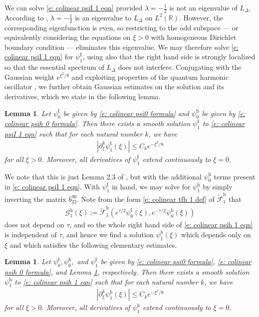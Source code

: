 \documentclass[11pt]{article}
\newcommand{\R}{\mathbb{R}}
\newtheorem{lemma}[prop]{Lemma}
\numberwithin{equation}{section}
\numberwithin{prop}{section}
\newcommand{\psih}{\psi^\mathrm{h}}
\newcommand{\Gh}{\mathcal{G}^\mathrm{h}}
\newcommand{\tfh}{\tilde{\mathcal{F}}^\mathrm{h}}
\newcommand{\psiI}{\psi^\mathrm{I}}
\begin{document}
We can solve \eqref{e: colinear psiI 1 eqn} provided $\lambda = -\frac{1}{2}$ is not an eigenvalue of $L_\Delta$. According to \cite[Appendix A]{GallayWayne}, $\lambda = -\frac{1}{2}$ is an eigenvalue to $L_\Delta$ on $L^2 (\R)$. However, the corresponding eigenfunction is even, so restricting to the odd subspace ---  or equivalently considering the equations on $\xi > 0$ with homogeneous Dirichlet boundary condition --- eliminates this eigenvalue. We may therefore solve \eqref{e: colinear psiI 1 eqn} for $\psiI_1$, using also that the right hand side is strongly localized so that the essential spectrum of $L_\Delta$ does not interfere. Conjugating with the Gaussian weight $e^{\xi^2/8}$ and exploiting properties of the quantum harmonic oscillator \cite{Helffer}, we further obtain Gaussian estimates on the solution and its derivatives, which we state in the following lemma. 
\begin{lemma}\label{l: colinear psiI 1}
	Let $\psiI_0$ be given by \eqref{e: colinear psi0 formula} and $\psih_0$ be given by \eqref{e: colinear psih 0 formula}. Then there exists a smooth solution $\psiI_1$ to \eqref{e: colinear psiI 1 eqn} such that for each natural number $k$, we have 
	\begin{align}
	|\partial_\xi^k \psiI_1 (\xi) | \leq C_k e^{-\xi^2/8} 
	\end{align}
	for all $\xi > 0$. Moreover, all derivatives of $\psiI_1$ extend continuously to $\xi = 0$. 
\end{lemma}
We note that this is just Lemma 2.3 of \cite{CAMS}, but with the additional $\psih_0$ terms present in \eqref{e: colinear psiI 1 eqn}. With $\psiI_1$ in hand, we may solve for $\psih_1$ by simply inverting the matrix $b_{22}^{00}$. Note from the form \eqref{e: colinear tfh 1 def} of $\tfh_1$ that
\begin{align}
\Gh_1(\xi) := \tfh_1 (e^{\tau/2} \psiI_0(\xi), e^{-\tau/2} \psih_0 (\xi)) 
\end{align}
does not depend on $\tau$, and so the whole right hand side of \eqref{e: colinear psih 1 eqn} is independent of $\tau$, and hence we find a solution $\psih_1(\xi)$ which depends only on $\xi$ and which satisfies the following elementary estimates.
\begin{lemma}\label{l: colinear psih 1}
	Let $\psiI_0, \psih_0,$ and $\psiI_1$ be given by \eqref{e: colinear psi0 formula}, \eqref{e: colinear psih 0 formula}, and Lemma \ref{l: colinear psiI 1}, respectively. Then there exists a smooth solution $\psih_1$ to \eqref{e: colinear psih 1 eqn} such that for each natural number $k$, we have 
	\begin{align}
	| \partial_\xi^k \psih_1 (\xi) | \leq C_k e^{-\xi^2/8}
	\end{align}
	for all $\xi > 0$. Moreover, all derivatives of $\psih_1$ extend continuously to $\xi = 0$. 
\end{lemma}
\end{document}
